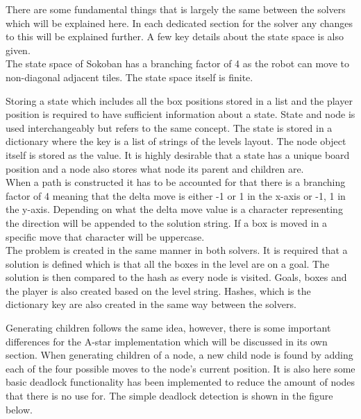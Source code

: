 \documentclass[../../main.tex]{subfiles}
\begin{document}
There are some fundamental things that is largely the same between the solvers which will be explained here. In each dedicated section for the solver any changes to this will be explained further. A few key details about the state space is also given. \\

The state space of Sokoban has a branching factor of 4 as the robot can move to non-diagonal adjacent tiles. The state space itself is finite.

Storing a state which includes all the box positions stored in a list and the player position is required to have 				sufficient 	information about a state. State and node is used interchangeably but refers to the same concept. The state is stored in a dictionary where the key is a list of strings of the levels layout. The node object itself is stored as the value. It is highly desirable that a state has a unique board position and a node also stores what node its parent and children are. \\

When a path is constructed it has to be accounted for that there is a branching factor of 4 meaning that the delta move is either -1 or 1 in the x-axis or -1, 1 in the y-axis. Depending on what the delta move value is a character representing the direction will be appended to the solution string. If a box is moved in a specific move that character will be uppercase. \\

The problem is created in the same manner in both solvers. It is required that a solution is defined which is that all the boxes in the level are on a goal. The solution is then compared to the hash as every node is visited. Goals, boxes and the player is also created based on the level string. Hashes, which is the dictionary key are also created in the same way between the solvers. 

Generating children follows the same idea, however, there is some important differences for the A-star implementation which will be discussed in its own section. When generating children of a node, a new child node is found by adding each of the four possible moves to the node's current position. It is also here some basic deadlock functionality has been implemented to reduce the amount of nodes that there is no use for. The simple deadlock detection is shown in the figure below.
\end{document}
